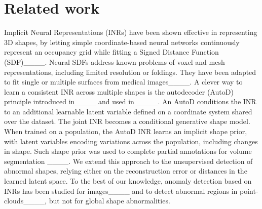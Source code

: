 \section{Related work}
\label{sec:related_work}
Implicit Neural Representations (INRs) have been shown effective in representing 3D shapes, by letting simple coordinate-based neural networks continuously represent an occupancy grid while fitting a Signed Distance Function (SDF)____. Neural SDFs address known problems of voxel and mesh representations, including limited resolution or foldings. They have been adapted to fit single or multiple surfaces from medical images____. A clever way to learn a consistent INR across multiple shapes is the autodecoder (AutoD) principle introduced in____ and used in ____. An AutoD conditions the INR to an additional learnable latent variable defined on a coordinate system shared over the dataset. The joint INR  becomes a conditional generative shape model. 
When trained on a population, the AutoD INR learns an implicit shape prior, with latent variables encoding variations across the population, including  changes in shape. Such shape prior was used to complete partial annotations for volume segmentation ____. 
We extend this approach to the unsupervised detection of abnormal shapes, relying either on the reconstruction error or distances in the learned latent space. To the best of our knowledge, anomaly detection based on INRs has been studied for images____ and to detect abnormal regions in point-clouds____, but not for global shape abnormalities.